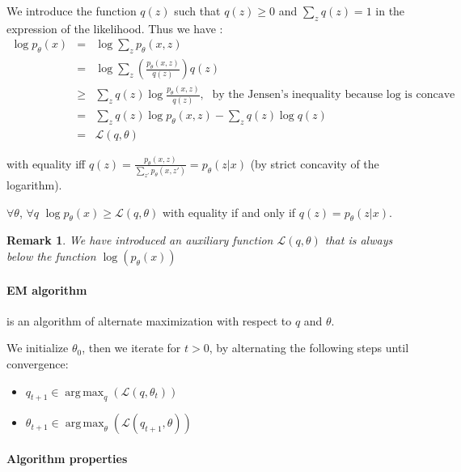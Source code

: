 \documentclass[12pt]{report}
\newtheorem{remarque}{Remark}[section]
\begin{document}
We introduce the function $q(z)$
such that $q(z) \geq 0$ and $\sum_zq(z)=1$ in the expression of the likelihood. Thus we have :
\begin{eqnarray*}
  \log p_{\theta}(x) &=& \log \sum_z p_{\theta}(x,z)\\
  &=& \log \sum_z \left(\frac{p_{\theta}(x,z)}{q(z)} \right) q(z) \\
  &\geq& \sum_z q(z) \log \frac{p_{\theta}(x,z)}{q(z)},\textrm{ by the Jensen's inequality because $\log$ is concave}\\
  &=& \sum_z q(z) \log p_{\theta}(x,z) - \sum_z q(z) \log q(z)\\
  &=& \mathcal{L}(q,\theta)
\end{eqnarray*}

with equality iff $q(z)=\frac{p_{\theta}(x,z)}{\sum_{z'}
  p_{\theta}(x,z')}=p_{\theta}(z|x)$ (by strict concavity of the logarithm).

\begin{proposition} $\forall \theta$, $\forall q$ $\log p_{\theta}(x)
\geq \mathcal{L}(q,\theta)$ with equality if and only if
$q(z)=p_{\theta}(z|x)$.
\end{proposition}

\begin{remarque} We have introduced an auxiliary function $\mathcal{L}(q,\theta)$ that is always below the function 
$\log(p_{\theta}(x))$
\end{remarque}


\paragraph{EM algorithm}

is an algorithm of alternate maximization with respect to $q$ and $\theta$.

We initialize $\theta_0$, then we iterate for $t>0$, by alternating the following steps until convergence:
\begin{itemize}
\item  $q_{t+1} \in \operatorname{arg\,max}_q(\mathcal{L}(q,\theta_t))$
\item  $\theta_{t+1} \in \operatorname{arg\,max}_{\theta}(\mathcal{L}(q_{t+1},\theta))$
\end{itemize}

\paragraph{Algorithm properties}
\end{document}
